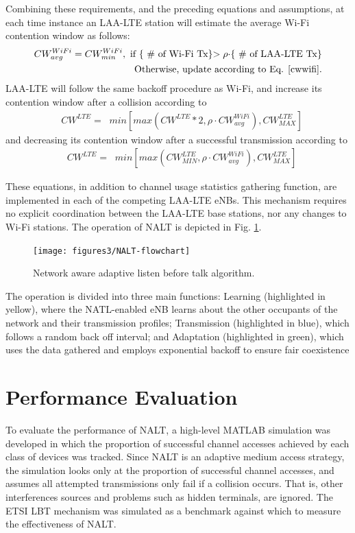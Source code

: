 Combining these requirements, and the preceding equations and assumptions, at each time instance an \mbox{LAA-LTE} station will estimate the average \mbox{Wi-Fi} contention window as follows:
\begin{align}
CW^{WiFi}_{avg} = CW^{WiFi}_{min}, \text{  if \{ \# of \mbox{Wi-Fi} Tx\}$> \rho\cdot$\{  \# of \mbox{LAA-LTE} Tx\}}\notag\\ 
\text{Otherwise, update according to Eq. \ref{cwwifi}.}
\end{align}
\mbox{LAA-LTE} will follow the same backoff procedure as \mbox{Wi-Fi}, and increase its contention window after a collision according to
\begin{align}
&CW^{LTE}=\;\;min\left[max\left(CW^{LTE}*2,\rho \cdot CW^{WiFi}_{avg}\right), CW^{LTE}_{MAX}\right]
\end{align}
and decreasing its contention window after a successful transmission according to 
\begin{align}
&CW^{LTE}=\;\;min\left[max\left(CW^{LTE}_{MIN},\rho \cdot CW^{WiFi}_{avg}\right), CW^{LTE}_{MAX}\right]
\end{align}

These equations, in addition to channel usage statistics gathering function, are implemented in each of the competing LAA-LTE eNBs.  This mechanism requires no explicit coordination between the LAA-LTE base stations, nor any changes to Wi-Fi stations. The operation of NALT is depicted in Fig. \ref{NALT-flowchart}. 
\begin{figure}[!ht]
	\centering
	\texttt{[image: figures3/NALT-flowchart]}
	\caption{Network aware adaptive listen before talk algorithm.}
	\label{NALT-flowchart}
\end{figure}%
The operation is divided into three main functions: Learning (highlighted in yellow), where the NATL-enabled eNB learns about the other occupants of the network and their transmission profiles; Transmission (highlighted in blue), which follows a random back off interval; and Adaptation (highlighted in green), which uses the data gathered and employs exponential backoff to ensure fair coexistence


\section{Performance Evaluation}\label{perf-eval}
To evaluate the performance of NALT, a high-level MATLAB simulation was developed in which the proportion of successful channel accesses achieved by each class of devices was tracked. Since NALT is an adaptive medium access strategy, the simulation looks only at the proportion of successful channel accesses, and assumes all attempted transmissions only fail if a collision occurs.  That is, other interferences sources and problems such as hidden terminals, are ignored.  The ETSI LBT mechanism was simulated as a benchmark against which to measure the effectiveness of NALT.


